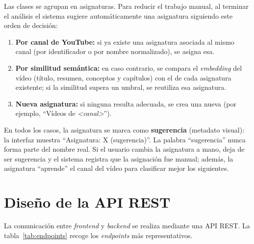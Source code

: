 Las clases se agrupan en asignaturas. Para reducir el trabajo manual, al terminar el análisis el
sistema sugiere automáticamente una asignatura siguiendo este orden de decisión:

\begin{enumerate}
  \item \textbf{Por canal de YouTube:} si ya existe una asignatura asociada al mismo canal
        (por identificador o por nombre normalizado), se asigna esa.
  \item \textbf{Por similitud semántica:} en caso contrario, se compara el \textit{embedding} del
        vídeo (título, resumen, conceptos y capítulos) con el de cada asignatura existente; si la
        similitud supera un umbral, se reutiliza esa asignatura.
  \item \textbf{Nueva asignatura:} si ninguna resulta adecuada, se crea una nueva (por ejemplo,
        ``Vídeos de \textit{<canal>}'').
\end{enumerate}

En todos los casos, la asignatura se marca como \textbf{sugerencia} (metadato visual): la interfaz
muestra ``Asignatura: X (sugerencia)''. La palabra ``sugerencia'' nunca forma parte del nombre
real. Si el usuario cambia la asignatura a mano, deja de ser sugerencia y el sistema registra que
la asignación fue manual; además, la asignatura ``aprende'' el canal del vídeo para clasificar
mejor los siguientes.

\section{Diseño de la API REST}

La comunicación entre \textit{frontend} y \textit{backend} se realiza mediante una API REST. La
tabla~\ref{tab:endpoints} recoge los \textit{endpoints} más representativos.

